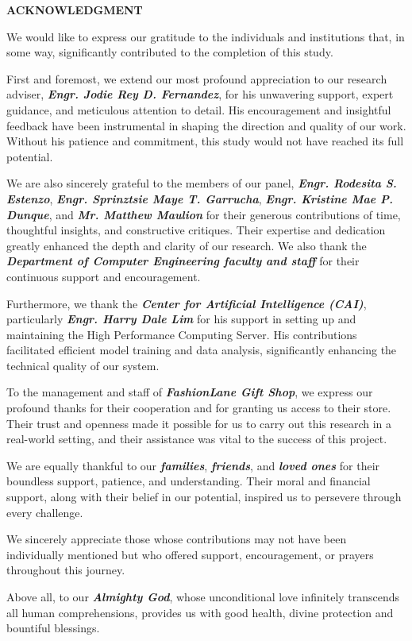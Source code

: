 \clearpage
\begin{center}
	{\bf ACKNOWLEDGMENT}\\[24pt]
\end{center}
\pagestyle{fancy} %
{\baselineskip

We would like to express our gratitude to the individuals and institutions that, in some way, significantly contributed to the completion of this study.

First and foremost, we extend our most profound appreciation to our research adviser, \textbf{\textit{Engr. Jodie Rey D. Fernandez}}, for his unwavering support, expert guidance, and meticulous attention to detail. His encouragement and insightful feedback have been instrumental in shaping the direction and quality of our work. Without his patience and commitment, this study would not have reached its full potential.

We are also sincerely grateful to the members of our panel, \textbf{\textit{Engr. Rodesita S. Estenzo}}, \textbf{\textit{Engr. Sprinztsie Maye T. Garrucha}}, \textbf{\textit{Engr. Kristine Mae P. Dunque}}, and \textbf{\textit{Mr. Matthew Maulion}} for their generous contributions of time, thoughtful insights, and constructive critiques. Their expertise and dedication greatly enhanced the depth and clarity of our research. We also thank the \textbf{\textit{Department of Computer Engineering faculty and staff}} for their continuous support and encouragement.

Furthermore, we thank the \textbf{\textit{Center for Artificial Intelligence (CAI)}}, particularly \textbf{\textit{Engr. Harry Dale Lim}} for his support in setting up and maintaining the High Performance Computing Server. His contributions facilitated efficient model training and data analysis, significantly enhancing the technical quality of our system.

To the management and staff of \textbf{\textit{FashionLane Gift Shop}}, we express our profound thanks for their cooperation and for granting us access to their store. Their trust and openness made it possible for us to carry out this research in a real-world setting, and their assistance was vital to the success of this project.

We are equally thankful to our \textbf{\textit{families}}, \textbf{\textit{friends}}, and \textbf{\textit{loved ones}} for their boundless support, patience, and understanding. Their moral and financial support, along with their belief in our potential, inspired us to persevere through every challenge.

We sincerely appreciate those whose contributions may not have been individually mentioned but who offered support, encouragement, or prayers throughout this journey.

Above all, to our \textbf{\textit{Almighty God}}, whose unconditional love infinitely transcends all human comprehensions, provides us with good health, divine protection and bountiful blessings.

}